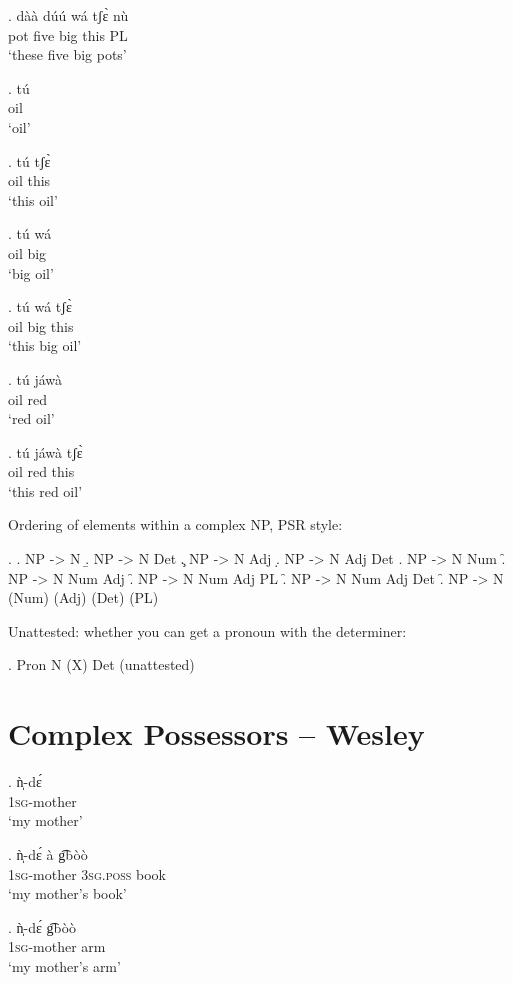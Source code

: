 \documentclass{assets/fieldnotes}
\begin{document}
\exg.
dàà   dúú    wá    tʃɛ̀    nù \\
pot   five   big   this   PL \\%
`these five big pots'

\exg.
tú  \\
oil \\%
`oil'

\exg.
tú    tʃɛ̀  \\
oil   this \\%
`this oil'

\exg.
tú    wá  \\
oil   big \\%
`big oil'

\exg.
tú    wá    tʃɛ̀  \\
oil   big   this \\%
`this big oil'

\exg.
tú    jáwà \\
oil   red  \\%
`red oil'

\exg.
tú    jáwà   tʃɛ̀  \\
oil   red    this \\%
`this red oil'

Ordering of elements within a complex NP, PSR style:

\ex.
\a. NP -> N 
\b. NP -> N Det
\c. NP -> N Adj
\d. NP -> N Adj Det
\e. NP -> N Num
\f. NP -> N Num Adj
\f. NP -> N Num Adj PL
\f. NP -> N Num Adj Det
\f. NP -> N (Num) (Adj) (Det) (PL)

Unattested: whether you can get a pronoun with the determiner:

\ex. Pron N (X) Det (unattested)



\section{Complex Possessors -- Wesley} 

\exg. ǹ̩-dɛ́\\
\textsc{1sg}-mother\\
`my mother'

\exg. ǹ̩-dɛ́ à g͡bòò\\
\textsc{1sg}-mother \textsc{3sg.poss} book\\
`my mother’s book'

\exg. ǹ̩-dɛ́ g͡bòò\\
\textsc{1sg}-mother arm\\
`my mother’s arm'
\end{document}
